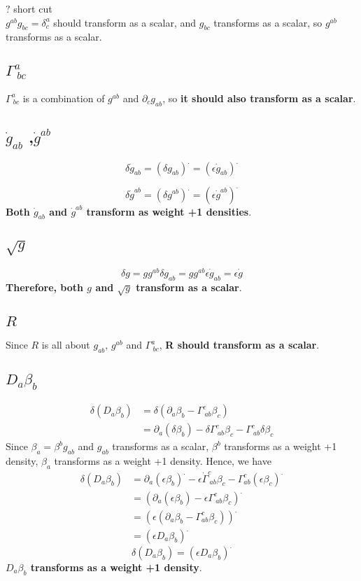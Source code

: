 \documentclass{article}
\begin{document}
$?$ short cut\\
$g^{ab}g_{bc} = \delta^{a}_{c}$ should transform as a scalar, and $g_{bc}$ transforms as a scalar, so $g^{ab}$ transforms as a scalar.  
\subsection{$\Gamma^{a}_{~bc}$}
$\Gamma^{a}_{~bc}$ is a combination of $g^{ab}$ and $\partial_{c}g_{ab}$, so {\bf {\color {red} it should also transform as a scalar}}.
\subsection{${\dot g}_{ab}$ ,${\dot g}^{ab}$}
\[
\boxed{
\delta {\dot g}_{ab} = (\delta g_{ab})^{.} = (\epsilon {\dot g_{ab}})^{.}
}
\]

\[
\boxed{
\delta {\dot g}^{ab} = (\delta g^{ab})^{.} = (\epsilon {\dot g^{ab}})^{.}
}
\]
{\bf {\color{red} Both ${\dot g}_{ab}$ and ${\dot g}^{ab}$ transform as weight +1 densities}}.
\subsection{$\sqrt{g}$}
\[
\boxed{
\delta g = g g^{ab}\delta g_{ab} = g g^{ab}\epsilon{\dot g}_{ab} = \epsilon {\dot g}
}
\]
{\bf{\color{red} Therefore, both $g$ and $\sqrt{g}$ transform as a scalar}}.
\subsection{$R$}
Since $R$ is all about $g_{ab}$, $g^{ab}$ and $\Gamma^{a}_{~bc}$, {\bf {\color{red}R should transform as a scalar}}. 
\subsection{$D_{a}\beta_{b}$}
\begin{align*}
\delta (D_{a}\beta_{b}) & = \delta (\partial_{a} \beta_{b} - \Gamma^{c}_{~ab}\beta_{c})\\
& = \partial_{a} (\delta \beta_{b}) - \delta \Gamma^{c}_{~ab} \beta_{c} - \Gamma^{c}_{~ab} \delta \beta_{c}
\end{align*}
Since $\beta_{a} = \beta^{b}g_{ab}$ and $g_{ab}$ transforms as a scalar, $\beta^{b}$ transforms as a weight +1 density, $\beta_{a}$ transforms as a weight +1 density. Hence, we have
\begin{align*}
\delta (D_{a}\beta_{b}) & = \partial_{a} (\epsilon \beta_{b})^{.} - \epsilon {\dot \Gamma}^{c}_{~ab} \beta_{c} - \Gamma^{c}_{ab}(\epsilon \beta_{c})^{.}\\
& = (\partial_{a} (\epsilon \beta_{b}) - \epsilon \Gamma^{c}_{~ab}\beta_{c})^{.}\\
& = (\epsilon (\partial_{a} \beta_{b} - \Gamma^{c}_{ab}\beta_{c}))^{.}\\
& = (\epsilon D_{a}\beta_{b})^{.}
\end{align*}
\[
\boxed{
\delta (D_{a}\beta_{b}) = (\epsilon D_{a}\beta_{b})^{.}
}
\]
{\bf {\color{red} $D_{a}\beta_{b}$ transforms as a weight +1 density}}.
\end{document}
